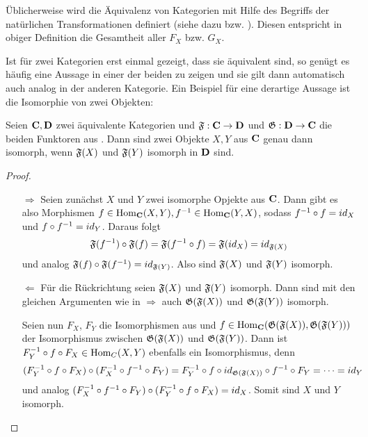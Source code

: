 \begin{bem}
Üblicherweise wird die Äquivalenz von Kategorien mit Hilfe des Begriffs der natürlichen Transformationen definiert (siehe dazu \cite[Kapitel 4]{Pizza2013} bzw. \cite[Defintionen 7 \& 10]{Ambrogio2009}). Diesen entspricht in obiger Definition die Gesamtheit aller $F_X$ bzw. $G_X$.
\end{bem}

Ist für zwei Kategorien erst einmal gezeigt, dass sie äquivalent sind, so genügt es häufig eine Aussage in einer der beiden zu zeigen und sie gilt dann automatisch auch analog in der anderen Kategorie. Ein Beispiel für eine derartige Aussage ist die Isomorphie von zwei Objekten:

\begin{lemma}\label{kor:KatIso2}
Seien $\mathbf{C}, \mathbf{D}$ zwei äquivalente Kategorien und $\mathfrak{F}: \mathbf{C} \to \mathbf{D}$ und $\mathfrak{G}:\mathbf{D} \to \mathbf{C}$ die beiden Funktoren aus . Dann sind zwei Objekte $X, Y$ aus $\mathbf{C}$ genau dann isomorph, wenn $\mathfrak{F}(X)$ und $\mathfrak{F}(Y)$ isomorph in $\mathbf{D}$ sind.
\end{lemma}

\begin{proof}\begin{itemize}
\item[\glqq$\Rightarrow$\grqq]Seien zunächst $X$ und $Y$ zwei isomorphe Opjekte aus $\mathbf{C}$. Dann gibt es also Morphismen  $f \in \mathrm{Hom}_{\mathbf{C}}(X,Y), f^{-1} \in \mathrm{Hom}_{\mathbf{C}}(Y,X)$, sodass $f^{-1} \circ f = id_X$ und $f \circ f^{-1} = id_Y$. Daraus folgt
	\[\mathfrak{F}(f^{-1})\circ \mathfrak{F}(f) = \mathfrak{F}(f^{-1}\circ f) = \mathfrak{F}(id_X) = id_{\mathfrak{F}(X)}\]
und analog $\mathfrak{F}(f)\circ \mathfrak{F}(f^{-1}) = id_{\mathfrak{F}(Y)}$. Also sind $\mathfrak{F}(X)$ und $\mathfrak{F}(Y)$ isomorph.

\item[\glqq$\Leftarrow$\grqq]Für die Rückrichtung seien $\mathfrak{F}(X)$ und $\mathfrak{F}(Y)$ isomorph. Dann sind mit den gleichen Argumenten wie in \glqq$\Rightarrow$\grqq{} auch $\mathfrak{G}(\mathfrak{F}(X))$ und $\mathfrak{G}(\mathfrak{F}(Y))$ isomorph. 

Seien nun $F_X$, $F_Y$ die Isomorphismen aus  und $f \in \mathrm{Hom}_{\mathbf{C}}(\mathfrak{G}(\mathfrak{F}(X)),\mathfrak{G}(\mathfrak{F}(Y)))$ der Isomorphismus zwischen $\mathfrak{G}(\mathfrak{F}(X))$ und $\mathfrak{G}(\mathfrak{F}(Y))$. Dann ist $F_Y^{-1} \circ f \circ F_X \in \mathrm{Hom}_C(X,Y)$ ebenfalls ein Isomorphismus, denn
	\[(F_Y^{-1} \circ f \circ F_X) \circ (F_X^{-1} \circ f^{-1} \circ F_Y) = F_Y^{-1} \circ f \circ id_{\mathfrak{G}(\mathfrak{F}(X))} \circ f^{-1} \circ F_Y = \dots = id_Y\]
und analog $(F_X^{-1} \circ f^{-1} \circ F_Y)\circ(F_Y^{-1} \circ f \circ F_X)  = id_X$. Somit sind $X$ und $Y$ isomorph.
\end{itemize}\end{proof}
